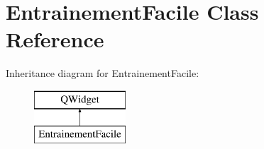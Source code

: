 \section{Entrainement\-Facile Class Reference}
\label{class_entrainement_facile}
Inheritance diagram for Entrainement\-Facile\-:\begin{figure}[H]
\begin{center}
\leavevmode
\includegraphics[height=2.000000cm]{class_entrainement_facile}
\end{center}
\end{figure}
